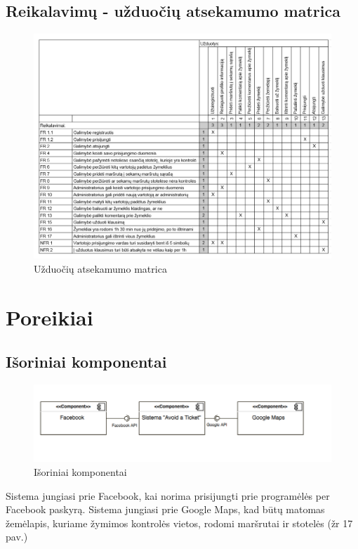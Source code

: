 \documentclass{VUMIFPSkursinis}
\begin{document}
\subsection{Reikalavimų - užduočių atsekamumo matrica}
	\begin{figure}[H]
				\centering
				\includegraphics[scale=0.4]{img/uzduociu_matrica}
				\caption{Užduočių atsekamumo matrica}
				\label{img:matrix}
			\end{figure}
			
\section{Poreikiai}
\subsection{Išoriniai komponentai}

\begin{figure}[H]
	\centering
	\includegraphics[scale=0.7]{img/Isoriniai_komponentai}
	\caption{Išoriniai komponentai}
	\label{img:matrix}
\end{figure}

Sistema jungiasi prie Facebook, kai norima prisijungti prie programėlės per Facebook paskyrą.
Sistema jungiasi prie Google Maps, kad būtų matomas žemėlapis, kuriame žymimos kontrolės vietos, rodomi maršrutai ir stotelės (žr 17 pav.)
\end{document}
